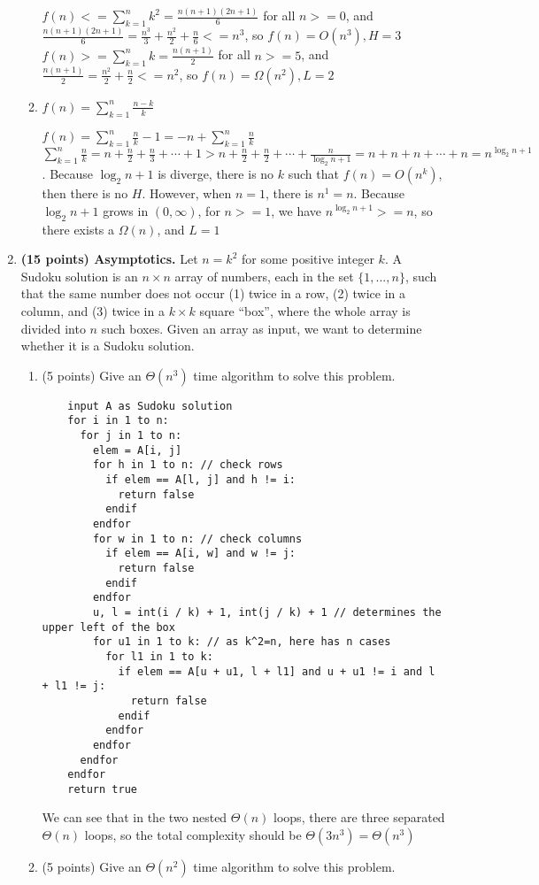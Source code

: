 \documentclass{article}
\newcommand{\thesoln}[1]{}
\newcommand{\thesoln}[1]{{\color{red}\textbf{Solution:} #1}}
\newcounter{problem}
\begin{document}
\begin{enumerate}[topsep=0pt]
\begin{enumerate}
    $f(n)<=\sum_{k=1}^nk^2=\frac{n(n+1)(2n+1)}{6}$ for all $n>=0$, and $\frac{n(n+1)(2n+1)}{6}=\frac{n^3}{3}+\frac{n^2}{2}+\frac{n}{6}<=n^3$, so $f(n)=O(n^3),H=3$
    $f(n)>=\sum_{k=1}^nk=\frac{n(n+1)}{2}$ for all $n>=5$, and $\frac{n(n+1)}{2}=\frac{n^2}{2}+\frac{n}{2}<=n^2$, so $f(n)=\Omega(n^2),L=2$
    \item $f(n) = \sum_{k=1}^n \frac{n-k}{k}$
    
    $f(n)=\sum_{k=1}^n\frac{n}{k}-1=-n+\sum_{k=1}^n\frac{n}{k}$
    $\sum_{k=1}^n\frac{n}{k}=n+\frac{n}{2}+\frac{n}{3}+\cdots+1>n+\frac{n}{2}+\frac{n}{2}+\cdots+\frac{n}{\log_2n+1}=n+n+n+\cdots+n=n^{\log_2n+1}$. Because $\log_2n+1$ is diverge, there is no $k$ such that $f(n)=O(n^k)$, then there is no $H$.
    However, when $n=1$, there is $n^{1}=n$. Because $\log_2n+1$ grows in $(0, \infty)$, for $n>=1$, we have $n^{\log_2n+1}>=n$, so there exists a $\Omega(n)$, and $L=1$
  \end{enumerate}

  \thesoln{
   
  }

\item \textbf{(15 points) Asymptotics.}
  Let $n = k^2$ for some positive integer $k$.  A Sudoku solution is an $n \times n$ array of numbers, each in the set $\{1,...,n\}$, such that the same number does not occur  (1) twice in a row, (2) twice in a column, and (3) twice in a $k \times k$ square ``box'', where the whole array is divided into $n$ such boxes.  Given an array as input, we want to determine whether it is a Sudoku solution.
\begin{enumerate}
  \item (5 points) Give an $\Theta(n^3)$ time algorithm to solve this problem.
  
  \begin{verbatim}
    input A as Sudoku solution
    for i in 1 to n:
      for j in 1 to n:
        elem = A[i, j]
        for h in 1 to n: // check rows
          if elem == A[l, j] and h != i:
            return false
          endif
        endfor
        for w in 1 to n: // check columns
          if elem == A[i, w] and w != j:
            return false
          endif
        endfor
        u, l = int(i / k) + 1, int(j / k) + 1 // determines the upper left of the box
        for u1 in 1 to k: // as k^2=n, here has n cases
          for l1 in 1 to k:
            if elem == A[u + u1, l + l1] and u + u1 != i and l + l1 != j:
              return false
            endif
          endfor
        endfor
      endfor
    endfor
    return true
  \end{verbatim}
  We can see that in the two nested $\Theta(n)$ loops, there are three separated $\Theta(n)$ loops, so the total complexity should be $\Theta(3n^3)=\Theta(n^3)$
  \item (5 points) Give an $\Theta(n^2)$ time algorithm to solve this problem.


\end{enumerate}
\end{enumerate}
\end{document}

